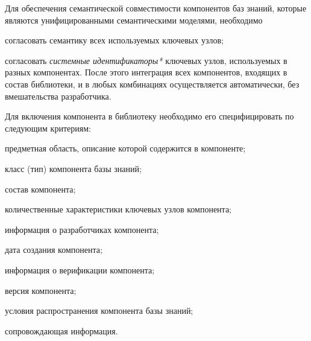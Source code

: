 \begin{SCn}
{Для обеспечения семантической совместимости компонентов баз знаний, которые являются унифицированными семантическими моделями, необходимо
\begin{scnitemize}
    \item согласовать семантику всех используемых ключевых узлов;
    \item согласовать \textit{системные идентификаторы*} ключевых узлов, используемых в разных компонентах. После этого интеграция всех компонентов, входящих в состав библиотеки, и в любых комбинациях осуществляется автоматически, без вмешательства разработчика.
\end{scnitemize}
Для включения компонента в библиотеку необходимо его специфицировать по следующим критериям:
\begin{scnitemize}
    \item предметная область, описание которой содержится в компоненте;
    \item класс (тип) компонента базы знаний;
    \item состав компонента;
    \item количественные характеристики ключевых узлов компонента;
    \item информация о разработчиках компонента;
    \item дата создания компонента;
    \item информация о верификации компонента;
    \item версия компонента;
    \item условия распространения компонента базы знаний;
    \item сопровождающая информация.
\end{scnitemize}
}

\scnendstruct

\end{SCn}